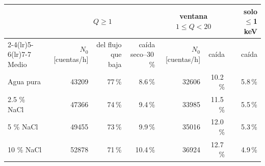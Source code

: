 \begin{tabular}{lrrrrrr}
\toprule
 & \multicolumn{3}{c}{$Q\geq1$} & \multicolumn{2}{c}{ventana $1\leq Q<20$} & solo $\leq$1 keV \\
\cmidrule(lr){2-4}\cmidrule(lr){5-6}\cmidrule(lr){7-7}
Medio & $N_0$ [cuentas/h] & del flujo que baja & caída seco--30\,\% & $N_0$ [cuentas/h] & caída & caída \\
\midrule
Agua pura & 43209 & 77\,\% & 8.6\,\% & 32606 & 10.2\,\% & 5.8\,\% \\
2.5 \% NaCl & 47366 & 74\,\% & 9.4\,\% & 33985 & 11.5\,\% & 5.5\,\% \\
5 \% NaCl & 49455 & 73\,\% & 9.9\,\% & 35016 & 12.0\,\% & 5.3\,\% \\
10 \% NaCl & 52878 & 71\,\% & 10.4\,\% & 36924 & 12.7\,\% & 4.9\,\% \\
\bottomrule
\end{tabular}

